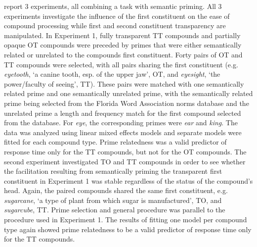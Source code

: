 \citet{El-Bialy_etal:2013} report 3 experiments, all combining a
 task with semantic priming. 
All 3 experiments
investigate the influence of the first constituent on the ease of
compound processing while first and second constituent transparency
are manipulated. In Experiment 1, fully transparent TT compounds and
partially opaque OT compounds were preceded by primes that were either
semantically related or unrelated to the compounds first
constituent.
 Forty pairs of OT and TT compounds were selected, with
all pairs sharing the first constituent (e.g. \emph{eyetooth}, `a
canine tooth, esp. of the upper jaw', OT,  and
\emph{eyesight}, `the power/faculty of seeing', TT). These pairs were matched with one semantically
related prime and one semantically unrelated prime, with the
semantically related prime being selected from the Florida Word
Association norms database \citep{Nelsonetal:1998} and the unrelated prime a length and
frequency match for the first compound selected from the 
database.\nocite{Baayenetal:1995} For \emph{eye}, the corresponding primes were \emph{ear} and
\emph{king}. The data was analyzed using linear mixed effects models
and separate models were fitted for each compound type. Prime
relatedness was a valid predictor of response time only for the TT
compounds, but not for the OT compounds. The second experiment
investigated TO and TT compounds in order to see whether the
facilitation resulting from semantically priming the transparent first
constituent in Experiment 1 was stable regardless of the status of
the compound's head. Again, the paired compounds shared the same first
constituent, e.g. \emph{sugarcane}, `a type of plant from which sugar
is manufactured', TO, and
\emph{sugarcube}, TT. Prime
selection and general procedure was parallel to the procedure used in
Experiment 1. The results of fitting one model per compound type
again showed prime relatedness to be a valid predictor of response
time only for the TT compounds.

